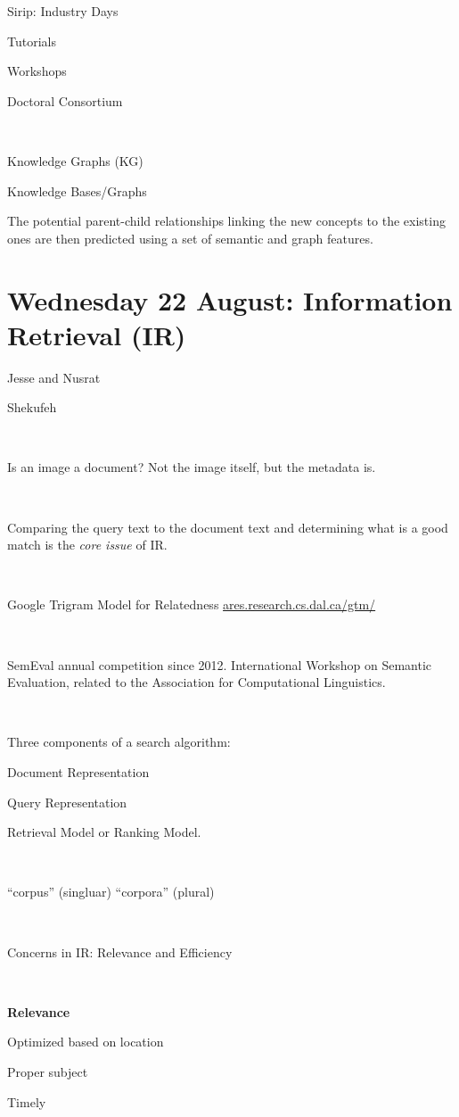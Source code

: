 \documentclass[11pt]{article}
\begin{document}
\begin{spacing}{1.2}
Sirip:  Industry Days

Tutorials

Workshops

Doctoral Consortium





\

Knowledge Graphs (KG)

Knowledge Bases/Graphs

The potential parent-child relationships linking the new concepts to the existing ones are then predicted using a set of semantic and graph features.


\section{Wednesday 22 August:  Information Retrieval (IR)}

Jesse and Nusrat

Shekufeh

\

Is an image a document?  Not the image itself, but the metadata is.  

\

Comparing the query text to the document text and determining what is a good match is the {\it core issue} of IR.  

\

Google Trigram Model for Relatedness  \url{ares.research.cs.dal.ca/gtm/}

\

SemEval annual competition since 2012.  International Workshop on Semantic Evaluation, related to the Association for Computational Linguistics.  

\

Three components of a search algorithm:

Document Representation

Query Representation

Retrieval Model or Ranking Model.  

\

``corpus'' (singluar) ``corpora'' (plural)

\

Concerns in IR:   Relevance and Efficiency

\

{\bf Relevance}

Optimized based on location

Proper subject

Timely


\end{spacing}
\end{document}
